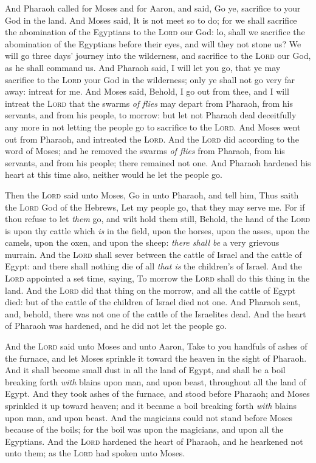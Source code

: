 \documentclass[11pt,letterpaper,oneside]{memoir}
\begin{document}
And Pharaoh called for Moses and for Aaron, and said, Go ye, sacrifice
to your God in the land. And Moses said, It is not meet so to do; for we
shall sacrifice the abomination of the Egyptians to the \textsc{Lord}
our God: lo, shall we sacrifice the abomination of the Egyptians before
their eyes, and will they not stone us? We will go three days' journey
into the wilderness, and sacrifice to the \textsc{Lord} our God, as he
shall command us. And Pharaoh said, I will let you go, that ye may
sacrifice to the \textsc{Lord} your God in the wilderness; only ye shall
not go very far away: intreat for me. And Moses said, Behold, I go out
from thee, and I will intreat the \textsc{Lord} that the swarms \emph{of
flies} may depart from Pharaoh, from his servants, and from his people,
to morrow: but let not Pharaoh deal deceitfully any more in not letting
the people go to sacrifice to the \textsc{Lord}. And Moses went out from
Pharaoh, and intreated the \textsc{Lord}. And the \textsc{Lord} did
according to the word of Moses; and he removed the swarms \emph{of
flies} from Pharaoh, from his servants, and from his people; there
remained not one. And Pharaoh hardened his heart at this time also,
neither would he let the people go.

Then the \textsc{Lord} said unto Moses, Go in unto Pharaoh, and tell
him, Thus saith the \textsc{Lord} God of the Hebrews, Let my people go,
that they may serve me. For if thou refuse to let \emph{them} go, and
wilt hold them still, Behold, the hand of the \textsc{Lord} is upon thy
cattle which \emph{is} in the field, upon the horses, upon the asses,
upon the camels, upon the oxen, and upon the sheep: \emph{there shall
be} a very grievous murrain. And the \textsc{Lord} shall sever between
the cattle of Israel and the cattle of Egypt: and there shall nothing
die of all \emph{that is} the children's of Israel. And the
\textsc{Lord} appointed a set time, saying, To morrow the \textsc{Lord}
shall do this thing in the land. And the \textsc{Lord} did that thing on
the morrow, and all the cattle of Egypt died: but of the cattle of the
children of Israel died not one. And Pharaoh sent, and, behold, there
was not one of the cattle of the Israelites dead. And the heart of
Pharaoh was hardened, and he did not let the people go.

And the \textsc{Lord} said unto Moses and unto Aaron, Take to you
handfuls of ashes of the furnace, and let Moses sprinkle it toward the
heaven in the sight of Pharaoh. And it shall become small dust in all
the land of Egypt, and shall be a boil breaking forth \emph{with} blains
upon man, and upon beast, throughout all the land of Egypt. And they
took ashes of the furnace, and stood before Pharaoh; and Moses sprinkled
it up toward heaven; and it became a boil breaking forth \emph{with}
blains upon man, and upon beast. And the magicians could not stand
before Moses because of the boils; for the boil was upon the magicians,
and upon all the Egyptians. And the \textsc{Lord} hardened the heart of
Pharaoh, and he hearkened not unto them; as the \textsc{Lord} had spoken
unto Moses.
\end{document}
